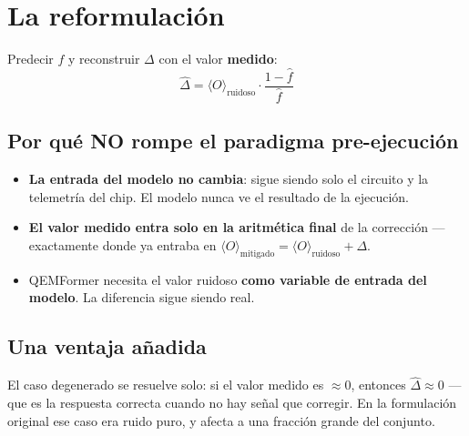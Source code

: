 \section{La reformulación}
\label{sec:reformulacion}
Predecir $f$ y reconstruir $\Delta$ con el valor \textbf{medido}:
\begin{equation}
\label{eq:reconstruccion}
\hat\Delta = \langle O \rangle_{\text{ruidoso}}\cdot\frac{1 - \hat f}{\hat f}
\end{equation}

\subsection{Por qué NO rompe el paradigma pre-ejecución}
\begin{itemize}
    \item \textbf{La entrada del modelo no cambia}: sigue siendo solo el circuito y la
          telemetría del chip. El modelo nunca ve el resultado de la ejecución.
    \item \textbf{El valor medido entra solo en la aritmética final} de la corrección —
          exactamente donde ya entraba en $\langle O \rangle_{\text{mitigado}} = \langle O
          \rangle_{\text{ruidoso}} + \Delta$.
    \item QEMFormer necesita el valor ruidoso \textbf{como variable de entrada del modelo}.
          La diferencia sigue siendo real.
\end{itemize}

\subsection{Una ventaja añadida}
El caso degenerado se resuelve solo: si el valor medido es $\approx 0$, entonces
$\hat\Delta \approx 0$ — que es la respuesta correcta cuando no hay señal que corregir. En la
formulación original ese caso era ruido puro, y afecta a una fracción grande del conjunto.

